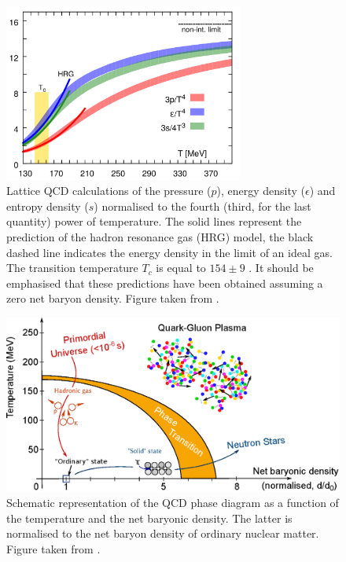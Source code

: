 \begin{figure}[!p]
	\centering
	\includegraphics[width=0.7\textwidth]{Figs/Chapter2/Pressure_energy_entropy.png}
	\caption{Lattice QCD calculations of the pressure ($p$), energy density ($\epsilon$) and entropy density ($s$) normalised to the fourth (third, for the last quantity) power of temperature. The solid lines represent the prediction of the hadron resonance gas (HRG) model, the black dashed line indicates the energy density in the limit of an ideal gas. The transition temperature $T_{c}$ is equal to $154 \pm 9$ \mev. It should be emphasised that these predictions have been obtained assuming a zero net baryon density. Figure taken from \cite{bazavovEquationStateFlavor2014}.}
	\label{fig:QCDEnergyDensity}
\end{figure}

\begin{figure}[!p]
	\centering
	\includegraphics[width=\textwidth]{Figs/Chapter2/DiagrPhase.eps}
	\caption{Schematic representation of the QCD phase diagram as a function of the temperature and the net baryonic density. The latter is normalised to the net baryon density of ordinary nuclear matter. Figure taken from \cite{mairePhaseDiagramQCD2015}.}
	\label{fig:QCDPhaseDiagram}
\end{figure}

